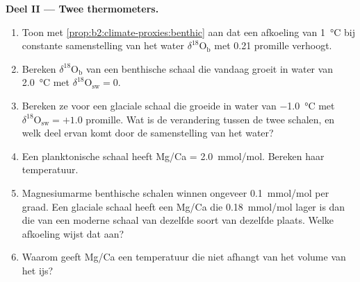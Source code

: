 \begin{problem}
\medskip\noindent\textbf{Deel II --- Twee thermometers.}
\begin{enumerate}[resume]
  \item Toon met \cref{prop:b2:climate-proxies:benthic} aan dat een afkoeling van \qty{1}{\celsius} bij
        constante samenstelling van het water $\delta^{18}\mathrm{O}_{\mathrm{b}}$ met \num{0.21} promille verhoogt.
  \item Bereken $\delta^{18}\mathrm{O}_{\mathrm{b}}$ van een benthische schaal die vandaag groeit in water van
        \qty{2.0}{\celsius} met $\delta^{18}\mathrm{O}_{\mathrm{sw}} = 0$.
  \item Bereken ze voor een glaciale schaal die groeide in water van \qty{-1.0}{\celsius} met
        $\delta^{18}\mathrm{O}_{\mathrm{sw}} = +1.0$ promille. Wat is de verandering tussen de twee
        schalen, en welk deel ervan komt door de samenstelling van het water?
  \item Een planktonische schaal heeft Mg/Ca = \qty{2.0}{mmol/mol}. Bereken haar temperatuur.
  \item Magnesiumarme benthische schalen winnen ongeveer \qty{0.1}{mmol/mol} per graad. Een glaciale schaal heeft
        een Mg/Ca die \qty{0.18}{mmol/mol} lager is dan die van een moderne schaal van dezelfde soort van dezelfde
        plaats. Welke afkoeling wijst dat aan?
  \item Waarom geeft Mg/Ca een temperatuur die niet afhangt van het volume van het ijs?
\end{enumerate}


\end{problem}
